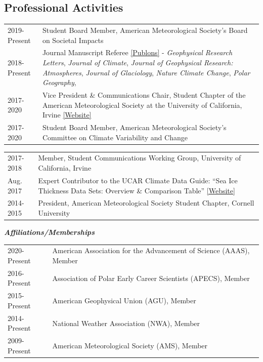 \documentclass[margin,line,palatino,courier,10pt]{res}
\begin{document}
\begin{resume}
\section{\sc \textcolor{Cerulean}{\large{\textbf{Professional Activities}}}}
\vspace*{0.05in}
\begin{tabular}{@{}p{0.9in}p{4in}}
2019-Present & Student Board Member, American Meteorological Society's Board on Societal Impacts\\
2018-Present & Journal Manuscript Referee \href{https://publons.com/author/1521902/zachary-labe#profile}{[Publons]} - \textit{Geophysical Research Letters}, \textit{Journal of Climate}, \textit{Journal of Geophysical Research: Atmospheres}, \textit{Journal of Glaciology}, \textit{Nature Climate Change}, \textit{Polar Geography},\\
2017-2020 & Vice President \& Communications Chair, Student Chapter of the American Meteorological Society at the University of California, Irvine \href{http://sites.uci.edu/zotcams/}{[Website]}\\
2017-2020 & Student Board Member, American Meteorological Society's Committee on Climate Variability and Change\\
\end{tabular}
\begin{tabular}{@{}p{0.9in}p{4in}}
2017-2018 & Member, Student Communications Working Group, University of California, Irvine\\
Aug. 2017 & Expert Contributor to the UCAR Climate Data Guide: ``Sea Ice Thickness Data Sets: Overview \& Comparison Table'' \href{https://climatedataguide.ucar.edu/climate-data/sea-ice-thickness-data-sets-overview-comparison-table}{[Website]}\\
2014-2015 & President, American Meteorological Society Student Chapter, Cornell University\\
\end{tabular}

\textit{\textbf{Affiliations/Memberships}}
\vspace*{0.05in}\\
\begin{tabular}{@{}p{0.9in}p{4in}}
2020-Present & American Association for the Advancement of Science (AAAS), Member\\
2016-Present & Association of Polar Early Career Scientists (APECS), Member\\ 
2015-Present & American Geophysical Union (AGU), Member\\
2014-Present & National Weather Association (NWA), Member\\
2009-Present & American Meteorological Society (AMS), Member\\
\end{tabular}

\end{resume}
\end{document}
